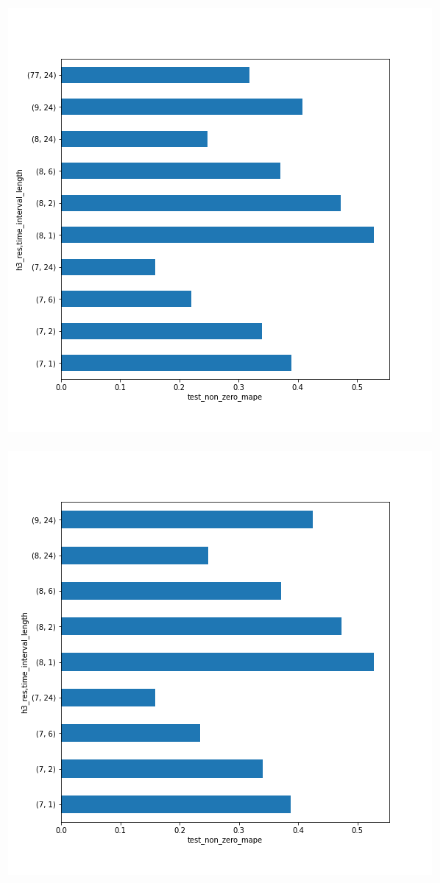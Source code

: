 \begin{figure}
    \centering
    \begin{minipage}{.5\textwidth}
        \centering
        \includegraphics[width=\linewidth]{figures/predictive_analysis/demand_test_non_zero_mape.png}
        \label{fig:non_zero_mape_demand}
    \end{minipage}%
    \begin{minipage}{.5\textwidth}
        \centering
        \includegraphics[width=\linewidth]{figures/predictive_analysis/availability_test_non_zero_mape.png}

\end{minipage}
\end{figure}
